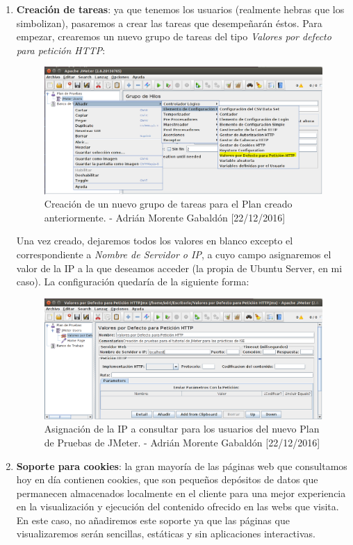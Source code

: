 \begin{enumerate}
		\item \textbf{Creación de tareas}: ya que tenemos los usuarios (realmente hebras que los simbolizan), pasaremos a crear las tareas que desempeñarán éstos. Para empezar, crearemos un nuevo grupo de tareas del tipo \emph{Valores por defecto para petición HTTP}:
		\begin{figure}[H]
			\centering
			\includegraphics[scale=0.4]{jmeter-http}
			\caption{Creación de un nuevo grupo de tareas para el Plan creado anteriormente. - Adrián Morente Gabaldón [22/12/2016]}
			\label{figura8}
		\end{figure}
		Una vez creado, dejaremos todos los valores en blanco excepto el correspondiente a \emph{Nombre de Servidor o IP}, a cuyo campo asignaremos el valor de la IP a la que deseamos acceder (la propia de Ubuntu Server, en mi caso). La configuración quedaría de la siguiente forma:
		\begin{figure}[H]
			\centering
			\includegraphics[scale=0.4]{jmeter-address}
			\caption{Asignación de la IP a consultar para los usuarios del nuevo Plan de Pruebas de JMeter. - Adrián Morente Gabaldón [22/12/2016]}
			\label{figura9}
		\end{figure}
	
		\item \textbf{Soporte para cookies}: la gran mayoría de las páginas web que consultamos hoy en día contienen cookies, que son pequeños depósitos de datos que permanecen almacenados localmente en el cliente para una mejor experiencia en la visualización y ejecución del contenido ofrecido en las webs que visita. En este caso, no añadiremos este soporte ya que las páginas que visualizaremos serán sencillas, estáticas y sin aplicaciones interactivas.
		

\end{enumerate}
